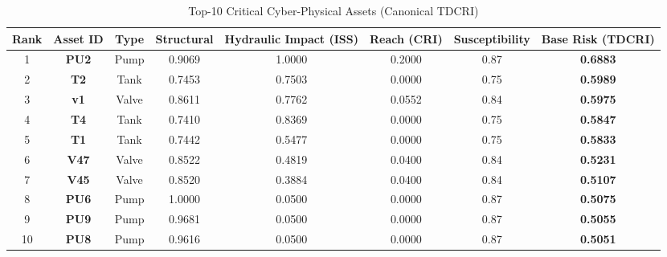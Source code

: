 \begin{table}[htbp]
\centering
\caption{Top-10 Critical Cyber-Physical Assets (Canonical TDCRI)}
\label{tab:risk_assets}
\begin{tabular}{cccccccc}
\toprule
Rank & Asset ID & Type & Structural & Hydraulic Impact (ISS) & Reach (CRI) & Susceptibility & Base Risk (TDCRI) \\
\midrule
1 & \textbf{PU2} & Pump & 0.9069 & 1.0000 & 0.2000 & 0.87 & \textbf{0.6883} \\
2 & \textbf{T2} & Tank & 0.7453 & 0.7503 & 0.0000 & 0.75 & \textbf{0.5989} \\
3 & \textbf{v1} & Valve & 0.8611 & 0.7762 & 0.0552 & 0.84 & \textbf{0.5975} \\
4 & \textbf{T4} & Tank & 0.7410 & 0.8369 & 0.0000 & 0.75 & \textbf{0.5847} \\
5 & \textbf{T1} & Tank & 0.7442 & 0.5477 & 0.0000 & 0.75 & \textbf{0.5833} \\
6 & \textbf{V47} & Valve & 0.8522 & 0.4819 & 0.0400 & 0.84 & \textbf{0.5231} \\
7 & \textbf{V45} & Valve & 0.8520 & 0.3884 & 0.0400 & 0.84 & \textbf{0.5107} \\
8 & \textbf{PU6} & Pump & 1.0000 & 0.0500 & 0.0000 & 0.87 & \textbf{0.5075} \\
9 & \textbf{PU9} & Pump & 0.9681 & 0.0500 & 0.0000 & 0.87 & \textbf{0.5055} \\
10 & \textbf{PU8} & Pump & 0.9616 & 0.0500 & 0.0000 & 0.87 & \textbf{0.5051} \\
\bottomrule
\end{tabular}
\end{table}
